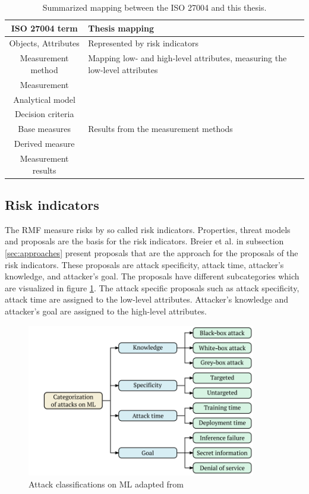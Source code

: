\begin{table}
\centering
  \begin{tabular}{| c | p{10cm} |}
  \hline
  \rowcolor{lightgray} ISO 27004 term & Thesis mapping \\ [0.5ex]
  \hline
  Objects, Attributes & Represented by risk indicators \\
  \hline
  Measurement method & Mapping low- and high-level attributes, measuring the low-level attributes \\
  \hline
  Measurement & \\
  \hline
  Analytical model & \\
  \hline
  Decision criteria & \\
  \hline
  Base measures & Results from the measurement methods \\
  \hline
  Derived measure & \\
  \hline
  Measurement results & \\
  \hline
  \end{tabular}
\caption{Summarized mapping between the ISO 27004 and this thesis.}
\label{tab:iso_table}
\end{table}

\subsection{Risk indicators}
\label{sec:risk_indicators}

The RMF measure risks by so called risk indicators. Properties, threat models and proposals are the basis for the risk indicators. Breier et al. \cite{DBLP:journals/corr/abs-2012-04884} in subsection \ref{sec:approaches} present
proposals that are the approach for the proposals of the risk indicators. These proposals are attack specificity, attack time, attacker's knowledge, and attacker's goal. The proposals have different subcategories which are visualized in figure \ref{fig:classifi_attacks_ml}. The attack specific proposals such as attack specificity, attack time are assigned to the low-level attributes. Attacker's knowledge and attacker's goal are assigned to the high-level attributes.

\begin{figure}[ht!]
  \centering
  \includegraphics[width=10cm]{pictures/classifi_attacks_ml.png}
  \caption{Attack classifications on ML adapted from \cite{DBLP:journals/corr/abs-2012-04884}}
  \label{fig:classifi_attacks_ml}
\end{figure}

